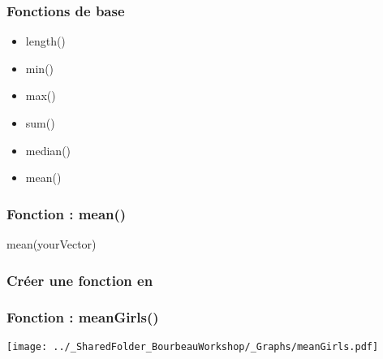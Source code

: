 \documentclass{beamer}
\begin{document}
    \begin{frame}
        \frametitle{Fonctions de base \R}
        \begin{itemize}
            \item length()
            \item min()
            \item max()
            \item sum()
            \item median()
            \item mean()
        \end{itemize}
    \end{frame}
        
    \begin{frame}[fragile=singleslide]
        \frametitle{Fonction \R : mean()}
        \begin{code}
mean(yourVector)
        \end{code}
    \end{frame}
    

    \begin{frame}[fragile=singleslide]
        \frametitle{Créer une fonction en \R}
    \end{frame}
    
    \begin{frame}
        \frametitle{Fonction \R : meanGirls()} \vspace{1cm}
        \begin{center}
            \texttt{[image: ../\_SharedFolder\_BourbeauWorkshop/\_Graphs/meanGirls.pdf]}
        \end{center}
    \end{frame}
    
\end{document}
